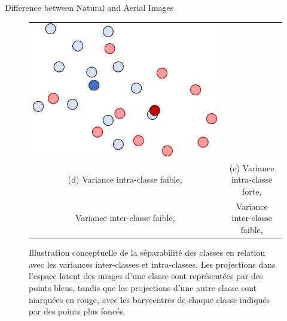 \begin{subsectionframemod}{Difference between Natural and Aerial Images}
\begin{figure}[!h]
\begin{tabular}{cc}
        \includegraphics[scale=0.25]{Figures/ncon_nsep.png}\\
        (d) Variance intra-classe faible, & (c) Variance intra-classe forte, \\
        Variance inter-classe faible,  & Variance inter-classe faible, \\
    \end{tabular}
    \caption{Illustration conceptuelle de la séparabilité des classes en relation avec les variances inter-classes et intra-classes. Les projections dans l'espace latent des images d'une classe sont représentées par des points bleus, tandis que les projections d'une autre classe sont marquées en rouge, avec les barycentres de chaque classe indiqués par des points plus foncés.}
    \label{fig:sep_classes}
\end{figure}
\end{subsectionframemod}



